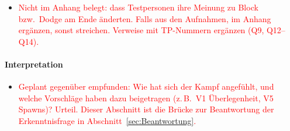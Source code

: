 \documentclass[../Main.tex]{subfiles}
\begin{document}
\begin{itemize}[leftmargin=1.5cm]
    \item \textcolor{red}{Nicht im Anhang belegt: dass Testpersonen ihre Meinung zu Block bzw.\ Dodge am Ende änderten. Falls aus den Aufnahmen, im Anhang ergänzen, sonst streichen. Verweise mit TP-Nummern ergänzen (Q9, Q12--Q14).}
\end{itemize}

\paragraph{Interpretation}
\begin{itemize}[leftmargin=1.5cm]
    \item \textcolor{red}{Geplant gegenüber empfunden: Wie hat sich der Kampf angefühlt, und welche Vorschläge haben dazu beigetragen (z.\,B.\ V1 Überlegenheit, V5 Spawns)? Urteil. Dieser Abschnitt ist die Brücke zur Beantwortung der Erkenntnisfrage in Abschnitt~\ref{sec:Beantwortung}.}
\end{itemize}
\end{document}
